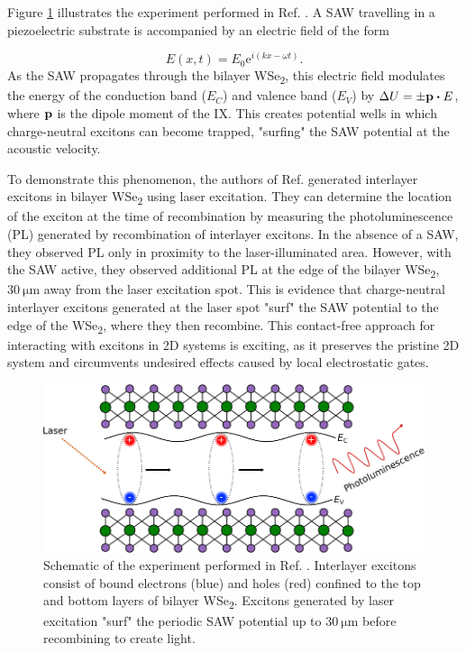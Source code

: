 \documentclass[double,12pt,1in]{beavtex}
\begin{document}
Figure \ref{IX transport fig} illustrates the experiment performed in Ref. \cite{peng_long-range_2022}. A SAW travelling in a piezoelectric substrate is accompanied by an electric field of the form

\begin{equation}
    E(x, t) = E_0 \mathrm{e}^{i(kx - \omega t)}. 
\end{equation}
As the SAW propagates through the bilayer WSe\textsubscript{2}, this electric field modulates the energy of the conduction band ($E_C$) and valence band ($E_V$) by $\Delta U = \pm \vectorbold{p} \dotproduct E$, where $\vectorbold{p}$ is the dipole moment of the IX. This creates potential wells in which charge-neutral excitons can become trapped, "surfing" the SAW potential at the acoustic velocity.

To demonstrate this phenomenon, the authors of Ref. \cite{peng_long-range_2022} generated interlayer excitons in bilayer WSe\textsubscript{2} using laser excitation. They can determine the location of the exciton at the time of recombination by measuring the photoluminescence (PL) generated by recombination of interlayer excitons. In the absence of a SAW, they observed PL only in proximity to the laser-illuminated area. However, with the SAW active, they observed additional PL at the edge of the bilayer WSe\textsubscript{2}, $\SI{30}{\micro\meter}$ away from the laser excitation spot. This is evidence that charge-neutral interlayer excitons generated at the laser spot "surf" the SAW potential to the edge of the WSe\textsubscript{2}, where they then recombine. This contact-free approach for interacting with excitons in 2D systems is exciting, as it preserves the pristine 2D system and circumvents undesired effects caused by local electrostatic gates.


\begin{figure}
    \includegraphics{IX transport fig.pdf}
    \caption{Schematic of the experiment performed in Ref. \cite{peng_long-range_2022}. Interlayer excitons consist of bound electrons (blue) and holes (red) confined to the top and bottom layers of bilayer WSe\textsubscript{2}. Excitons generated by laser excitation "surf" the periodic SAW potential up to $\SI{30}{\micro\meter}$ before recombining to create light.}
    \label{IX transport fig}
\end{figure}
\end{document}
